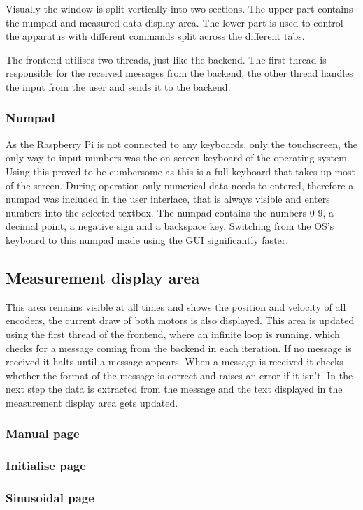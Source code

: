 \documentclass[12pt]{article}
\begin{document}
Visually the window is split vertically into two sections. The upper part contains the numpad and measured data display area. The lower part is used to control the apparatus with different commands split across the different tabs.

The frontend utilises two threads, just like the backend. The first thread is responsible for the received messages from the backend, the other thread handles the input from the user and sends it to the backend.


\subsubsection{Numpad}
As the Raspberry Pi is not connected to any keyboards, only the touchscreen, the only way to input numbers was the on-screen keyboard of the operating system. Using this proved to be cumbersome as this is a full keyboard that takes up most of the screen. During operation only numerical data needs to entered, therefore a numpad was included in the user interface, that is always visible and enters numbers into the selected textbox. The numpad contains the numbers 0-9, a decimal point, a negative sign and a backspace key. Switching from the OS's keyboard to this numpad made using the GUI significantly faster.


\subsection{Measurement display area}
This area remains visible at all times and shows the position and velocity of all encoders, the current draw of both motors is also displayed. This area is updated using the first thread of the frontend, where an infinite loop is running, which checks for a message coming from the backend in each iteration. If no message is received it halts until a message appears. When a message is received it checks whether the format of the message is correct and raises an error if it isn't. In the next step the data is extracted from the message and the text displayed in the measurement display area gets updated. 

\subsubsection{Manual page}
\subsubsection{Initialise page}
\subsubsection{Sinusoidal page}
\end{document}
